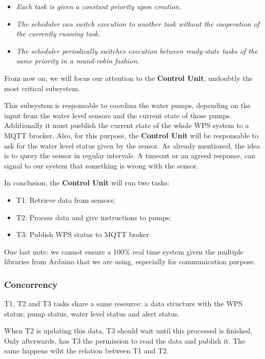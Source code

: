 \documentclass[11pt]{article}
\begin{document}
\begin{itemize}
	\item   \textit{Each task is given a constant priority upon creation.}
	\item  \textit{The scheduler can switch execution to another task without the cooperation of the currently running task.}
	\item  \textit{The scheduler periodically switches execution between ready-state tasks of the same priority in a round-robin fashion.} \cite{c1}
\end{itemize}

From now on, we will focus our attention to the \textbf{Control Unit}, undoubtly the most critical subsystem.

This subsystem is responsable to coordina the water pumps, depending on the input from the water level sensors and the current state of those pumps.
Additionally it must pusblish the current state of the whole WPS system to a MQTT brocker.
Also, for this purpose, the \textbf{Control Unit} will be responsable to ask for the water level status given by the sensor. As already mentioned, the idea is to query the sensor in regular intervals. A timeout or an agreed response, can signal to our system that something is wrong with the sensor.

In conclusion, the \textbf{Control Unit} will run two tasks:

\begin{itemize}
	\item  T1: Retrieve data from sensors;
	\item  T2: Process data and give instructions to pumps;
	\item  T3: Publish WPS status to MQTT broker.
\end{itemize}

One last note: we cannot ensure a 100\% real time system given the multiple libraries from Arduino that we are using, especially for communication purpose.

\subsubsection{Concorrency}

T1, T2 and T3 tasks share a same resource: a data structure with the WPS status; pump status, water level status and alert status.

When T2 is updating this data, T3 should wait until this processed is finished. Only afterwards, has T3 the permission to read the data and publish it.
The same happens wiht the relation between T1 and T2.
\end{document}
